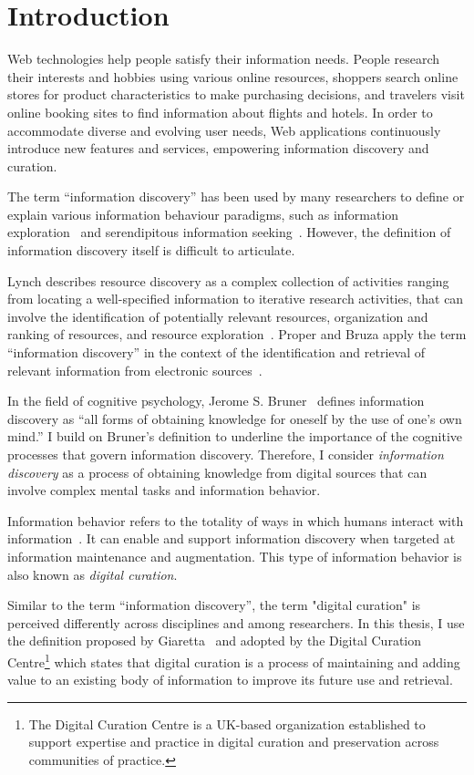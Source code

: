 \chapter{Introduction}
\label{chapter:chapter_intro}

Web technologies help people satisfy their information needs. People research their interests and hobbies using various online resources, shoppers search online stores for product characteristics to make purchasing decisions, and travelers visit online booking sites to find information about flights and hotels. In order to accommodate diverse and evolving user needs, Web applications continuously introduce new features and services, empowering information discovery and curation. 

The term ``information discovery'' has been used by many researchers to define or explain various information behaviour paradigms, such as information exploration~\cite{waterworth1991model} and serendipitous information seeking~\cite{foster2003serendipity}. However, the definition of information discovery itself is difficult to articulate. 

Lynch describes resource discovery as a complex collection of activities ranging from locating a well-specified information to iterative research activities, that can involve the identification
of potentially relevant resources, organization and ranking of resources, and resource exploration~\cite{lynch1995networked}. Proper and Bruza apply the term ``information discovery'' in the context of  the identification and retrieval of relevant information from electronic sources~\cite{proper1999information}. 

In the field of cognitive psychology, Jerome S. Bruner~\cite{bruner1961act} defines information discovery as ``all forms of obtaining knowledge for oneself by the use of one's own mind.'' I build on Bruner's definition to underline the importance of the cognitive processes that govern information discovery. Therefore, I consider \textit{information discovery} as a process of obtaining knowledge from digital sources that can involve complex mental tasks and information behavior.  
\pagebreak

Information behavior refers to the totality of ways in which humans interact with information~\cite{wilson2000human}. It can enable and support information discovery when targeted at information maintenance and augmentation. This type of information behavior is also known as \textit{digital curation}.

Similar to the term ``information discovery'', the term "digital curation" is perceived differently across disciplines and among researchers. In this thesis, I use the definition proposed by Giaretta~\cite{giaretta2006dcc} and adopted by the Digital Curation Centre\footnote{The Digital Curation Centre is a UK-based organization established to support expertise and practice in digital curation and preservation across communities of practice.} which states that digital curation is a process of maintaining and adding value to an existing body of information to improve its future use and retrieval.   

